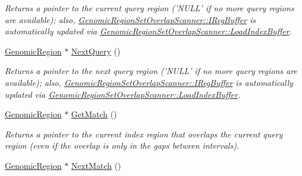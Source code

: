 \begin{CompactItemize}
\begin{CompactList}\small\item\em Returns a pointer to the current query region ('NULL' if no more query regions are available); also, \hyperlink{classGenomicRegionSetOverlapScanner_5cef1f4f621533d6ce6a47fc106f35cd}{GenomicRegionSetOverlapScanner::IRegBuffer} is automatically updated via \hyperlink{classGenomicRegionSetOverlapScanner_2241b4411418e51f21dfbbff56332940}{GenomicRegionSetOverlapScanner::LoadIndexBuffer}. \item\end{CompactList}\item 
\hypertarget{classGenomicRegionSetOverlapScanner_a237159db6addc8f09c4cc1c078898af}{
\hyperlink{classGenomicRegion}{GenomicRegion} $\ast$ \hyperlink{classGenomicRegionSetOverlapScanner_a237159db6addc8f09c4cc1c078898af}{NextQuery} ()}
\label{classGenomicRegionSetOverlapScanner_a237159db6addc8f09c4cc1c078898af}

\begin{CompactList}\small\item\em Returns a pointer to the next query region ('NULL' if no more query regions are available); also, \hyperlink{classGenomicRegionSetOverlapScanner_5cef1f4f621533d6ce6a47fc106f35cd}{GenomicRegionSetOverlapScanner::IRegBuffer} is automatically updated via \hyperlink{classGenomicRegionSetOverlapScanner_2241b4411418e51f21dfbbff56332940}{GenomicRegionSetOverlapScanner::LoadIndexBuffer}. \item\end{CompactList}\item 
\hypertarget{classGenomicRegionSetOverlapScanner_8fabf222feb13df18c4516a0c11e6c94}{
\hyperlink{classGenomicRegion}{GenomicRegion} $\ast$ \hyperlink{classGenomicRegionSetOverlapScanner_8fabf222feb13df18c4516a0c11e6c94}{GetMatch} ()}
\label{classGenomicRegionSetOverlapScanner_8fabf222feb13df18c4516a0c11e6c94}

\begin{CompactList}\small\item\em Returns a pointer to the current index region that overlaps the current query region (even if the overlap is only in the gaps between intervals). \item\end{CompactList}\item 
\hypertarget{classGenomicRegionSetOverlapScanner_59683f41c3512969c06ebe12c3c34892}{
\hyperlink{classGenomicRegion}{GenomicRegion} $\ast$ \hyperlink{classGenomicRegionSetOverlapScanner_59683f41c3512969c06ebe12c3c34892}{NextMatch} ()}
\label{classGenomicRegionSetOverlapScanner_59683f41c3512969c06ebe12c3c34892}


\end{CompactItemize}
